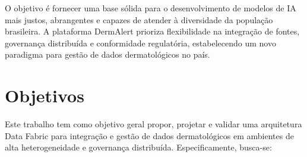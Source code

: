 O objetivo é fornecer uma base sólida para o desenvolvimento de modelos de IA mais justos, abrangentes e capazes de atender à diversidade da população brasileira. A plataforma DermAlert prioriza flexibilidade na integração de fontes, governança distribuída e conformidade regulatória, estabelecendo um novo paradigma para gestão de dados dermatológicos no país.

\section{Objetivos}

Este trabalho tem como objetivo geral propor, projetar e validar uma arquitetura Data Fabric para integração e gestão de dados dermatológicos em ambientes de alta heterogeneidade e governança distribuída. Especificamente, busca-se:

